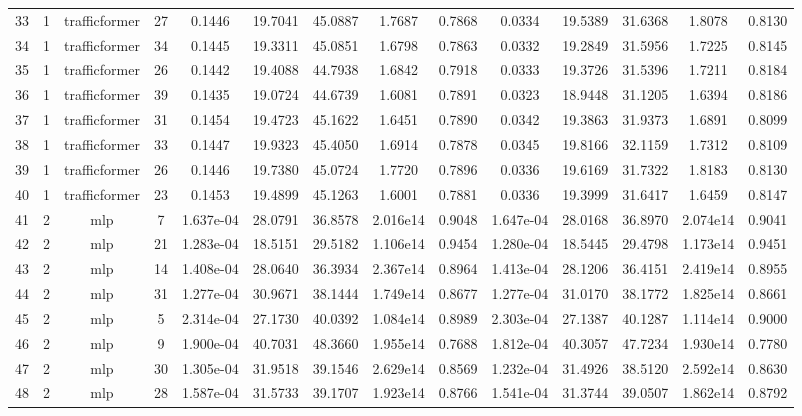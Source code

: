 \begin{landscape}
\begin{longtable}{c c c c c c c c c c c c c c}
	33 & 1 & trafficformer & 27 & 0.1446 & 19.7041 & 45.0887 & 1.7687 & 0.7868 & 0.0334 & 19.5389 & 31.6368 & 1.8078 & 0.8130 \\
	34 & 1 & trafficformer & 34 & 0.1445 & 19.3311 & 45.0851 & 1.6798 & 0.7863 & 0.0332 & 19.2849 & 31.5956 & 1.7225 & 0.8145 \\
	35 & 1 & trafficformer & 26 & 0.1442 & 19.4088 & 44.7938 & 1.6842 & 0.7918 & 0.0333 & 19.3726 & 31.5396 & 1.7211 & 0.8184 \\
	36 & 1 & trafficformer & 39 & 0.1435 & 19.0724 & 44.6739 & 1.6081 & 0.7891 & 0.0323 & 18.9448 & 31.1205 & 1.6394 & 0.8186 \\
	37 & 1 & trafficformer & 31 & 0.1454 & 19.4723 & 45.1622 & 1.6451 & 0.7890 & 0.0342 & 19.3863 & 31.9373 & 1.6891 & 0.8099 \\
	38 & 1 & trafficformer & 33 & 0.1447 & 19.9323 & 45.4050 & 1.6914 & 0.7878 & 0.0345 & 19.8166 & 32.1159 & 1.7312 & 0.8109 \\
	39 & 1 & trafficformer & 26 & 0.1446 & 19.7380 & 45.0724 & 1.7720 & 0.7896 & 0.0336 & 19.6169 & 31.7322 & 1.8183 & 0.8130 \\
	40 & 1 & trafficformer & 23 & 0.1453 & 19.4899 & 45.1263 & 1.6001 & 0.7881 & 0.0336 & 19.3999 & 31.6417 & 1.6459 & 0.8147 \\
	41 & 2 & mlp & 7 & 1.637e-04 & 28.0791 & 36.8578 & 2.016e14 & 0.9048 & 1.647e-04 & 28.0168 & 36.8970 & 2.074e14 & 0.9041 \\
	42 & 2 & mlp & 21 & 1.283e-04 & 18.5151 & 29.5182 & 1.106e14 & 0.9454 & 1.280e-04 & 18.5445 & 29.4798 & 1.173e14 & 0.9451 \\
	43 & 2 & mlp & 14 & 1.408e-04 & 28.0640 & 36.3934 & 2.367e14 & 0.8964 & 1.413e-04 & 28.1206 & 36.4151 & 2.419e14 & 0.8955 \\
	44 & 2 & mlp & 31 & 1.277e-04 & 30.9671 & 38.1444 & 1.749e14 & 0.8677 & 1.277e-04 & 31.0170 & 38.1772 & 1.825e14 & 0.8661 \\
	45 & 2 & mlp & 5 & 2.314e-04 & 27.1730 & 40.0392 & 1.084e14 & 0.8989 & 2.303e-04 & 27.1387 & 40.1287 & 1.114e14 & 0.9000 \\
	46 & 2 & mlp & 9 & 1.900e-04 & 40.7031 & 48.3660 & 1.955e14 & 0.7688 & 1.812e-04 & 40.3057 & 47.7234 & 1.930e14 & 0.7780 \\
	47 & 2 & mlp & 30 & 1.305e-04 & 31.9518 & 39.1546 & 2.629e14 & 0.8569 & 1.232e-04 & 31.4926 & 38.5120 & 2.592e14 & 0.8630 \\
	48 & 2 & mlp & 28 & 1.587e-04 & 31.5733 & 39.1707 & 1.923e14 & 0.8766 & 1.541e-04 & 31.3744 & 39.0507 & 1.862e14 & 0.8792 \\

\end{longtable}
\end{landscape}

